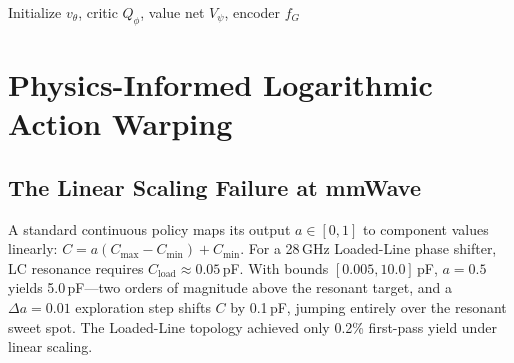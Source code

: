 \documentclass[sigconf,anonymous,review]{acmart}
\newcommand{\gdiffps}{\textsc{G-DiffPS}}
\begin{document}
\begin{algorithm}[t]
\DontPrintSemicolon
\SetAlgoLined
{}
Initialize $v_\theta$, critic $Q_\phi$, value net $V_\psi$, encoder $f_G$\;
\caption{\gdiffps{} online advantage-weighted training}
\label{alg:train}
\end{algorithm}

\section{Physics-Informed Logarithmic Action Warping}
\label{sec:warp}

\subsection{The Linear Scaling Failure at mmWave}

A standard continuous policy maps its output $a\in[0,1]$ to component values
linearly: $C=a(C_\text{max}-C_\text{min})+C_\text{min}$.  For a 28\,GHz
Loaded-Line phase shifter, LC resonance requires $C_\text{load}\approx0.05$\,pF.
With bounds $[0.005,10.0]$\,pF, $a=0.5$ yields 5.0\,pF---two orders of
magnitude above the resonant target, and a $\Delta a=0.01$ exploration step
shifts $C$ by 0.1\,pF, jumping entirely over the resonant sweet spot.
The Loaded-Line topology achieved only 0.2\% first-pass yield under linear
scaling.
\end{document}
